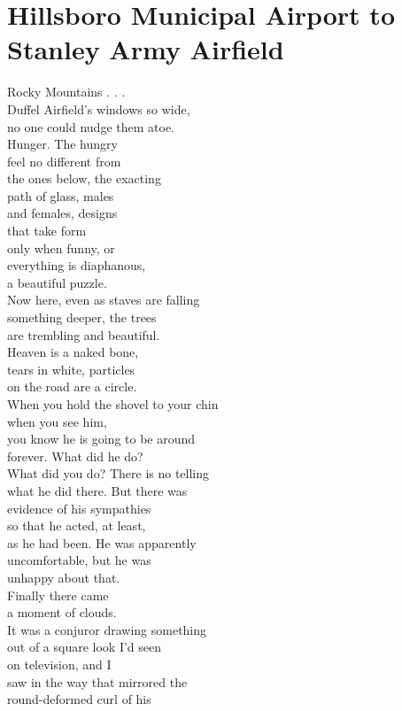 \documentclass[smalldemyvopaper,11pt,twoside,onecolumn,openright,extrafontsizes]{memoir}
\begin{document}
\chapter{Hillsboro Municipal Airport to Stanley Army Airfield}
Rocky Mountains . . .
\\Duffel Airfield's windows so wide,
\\no one could nudge them atoe.
\\Hunger. The hungry
\\feel no different from
\\the ones below, the exacting
\\path of glass, males
\\and females, designs
\\that take form
\\only when funny, or
\\everything is diaphanous,
\\a beautiful puzzle.
\\Now here, even as staves are falling
\\something deeper, the trees
\\are trembling and beautiful.
\\Heaven is a naked bone,
\\tears in white, particles
\\on the road are a circle.
\\When you hold the shovel to your chin
\\when you see him,
\\you know he is going to be around
\\forever. What did he do?
\\What did you do? There is no telling
\\what he did there. But there was
\\evidence of his sympathies
\\so that he acted, at least,
\\as he had been. He was apparently
\\uncomfortable, but he was
\\unhappy about that.
\\Finally there came
\\a moment of clouds.
\\It was a conjuror drawing something
\\out of a square look I'd seen
\\on television, and I
\\saw in the way that mirrored the
\\round-deformed curl of his
\end{document}
